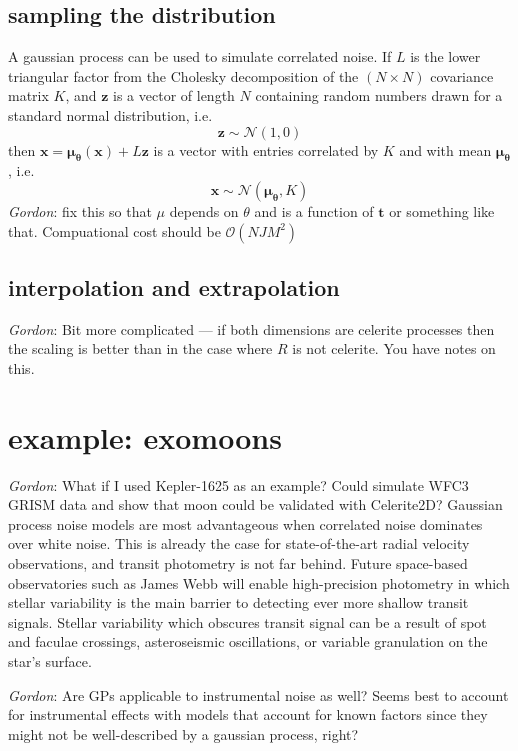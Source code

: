 \documentclass[modern]{aastex62}
\newcommand{\todo}[3]{{\color{#2}\emph{#1}: #3}}
\newcommand{\gordontodo}[1]{\todo{Gordon}{red}{#1}}
\newcommand{\bvec}[1]{{\ensuremath{\boldsymbol{#1}}}}
\begin{document}
	\subsection{sampling the distribution}
	A gaussian process can be used to simulate correlated noise. If $L$ is the lower triangular factor from the Cholesky decomposition of the 
	$(N\times N)$ covariance matrix $K$, and $\bvec{z}$ is a vector of length $N$ containing random numbers drawn for a standard normal distribution, i.e.
	\begin{equation}
		\bvec{z} \sim \mathcal{N}(1, 0)
	\end{equation}
	then $\bvec{x} = \bvec{\mu_\bvec{\theta}(\bvec{x})} + L\bvec{z}$ is a vector with entries correlated by $K$ and with mean $\bvec{\mu_\theta}$, i.e.
	\begin{equation}
		\bvec{x} \sim \mathcal{N}(\bvec{\mu_\theta}, K)
	\end{equation}
	\gordontodo{fix this so that $\mu$ depends on $\theta$ and is a function of $\bvec{t}$ or something like that. Compuational cost should be $\mathcal{O}(NJM^2)$}
	
	\subsection{interpolation and extrapolation}	
	\gordontodo{Bit more complicated --- if both dimensions are celerite processes then the scaling is better than in the case where $R$ is not celerite. You have notes on this.}
	
\section{example: exomoons}
	\gordontodo{What if I used Kepler-1625 as an example? Could simulate WFC3 GRISM data and show that moon could be validated with Celerite2D?}
	Gaussian process noise models are most advantageous when correlated noise dominates over white noise. 
	This is already the case for state-of-the-art radial velocity observations, and transit 
	photometry is not far behind. Future space-based observatories such as James Webb 
	will enable high-precision photometry in which stellar variability is the main barrier to detecting ever more shallow transit signals. 
	Stellar variability which obscures transit signal can be a result of spot and faculae crossings, asteroseismic oscillations, or variable 
	granulation on the star's surface. 
	
	\gordontodo{Are GPs applicable to instrumental noise as well? Seems best to account for instrumental effects with models that account for known factors since 
	they might not be well-described by a gaussian process, right?}
	
\end{document}
